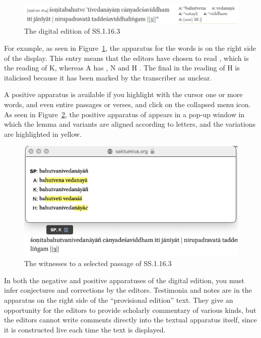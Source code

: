 \begin{figure}[h]
    \centering
    \includegraphics[draft=false, width=\textwidth]{media/SS.1.16.3}
    \caption{The digital edition of SS.1.16.3}
    \label{SS.1.16}
\end{figure}
For example, as seen in Figure~\ref{SS.1.16}, the apparatus for the words 
 is on the right side of the display. 
This entry means that the editors have chosen to read 
, which is the reading of K, whereas A has 
, N  and H 
. The final  in the reading of H is italicised 
because it has been marked by the transcriber as unclear.

A positive apparatus is available if you highlight with the cursor one or more
words, and even entire passages or verses, and click on the collapsed menu icon.
As seen in Figure~\ref{SS.1.16.3}, the positive apparatus of
 appears in a pop-up window in which the lemma and
variants are aligned according to letters, and the variations are highlighted in
yellow.

\begin{figure}[h]
    \centering
    \includegraphics[draft=false,width=\textwidth]{media/SS.1.16.positive}
    \caption{The witnesses to a selected passage of SS.1.16.3}
    \label{SS.1.16.3}
\end{figure}

In both the negative and positive apparatuses of the digital edition, you must
infer conjectures and corrections by the editors. Testimonia and notes are in the
apparatus on the right side of the “provisional edition” text.  They give an
opportunity for the editors to provide scholarly commentary of various kinds, but
the editors cannot write comments directly into the textual apparatus itself,
since it is constructed live each time the text is displayed.





